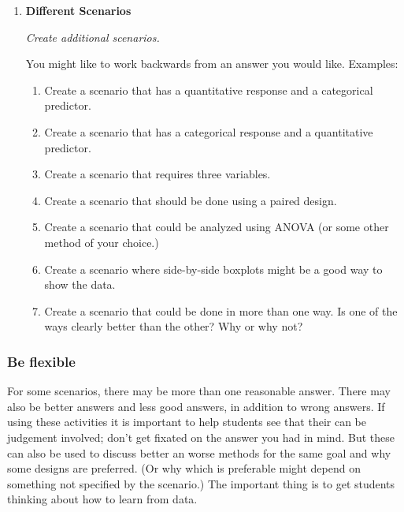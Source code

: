 \documentclass[]{article}
\providecommand{\tightlist}{%
  \setlength{\itemsep}{0pt}\setlength{\parskip}{0pt}}
\begin{document}
\begin{enumerate}
\def\labelenumi{\arabic{enumi}.}
\setcounter{enumi}{2}
\item
  \textbf{Different Scenarios}

  \emph{Create additional scenarios.}

  You might like to work backwards from an answer you would like.
  Examples:

  \begin{enumerate}
  \def\labelenumii{\alph{enumii}.}
  \tightlist
  \item
    Create a scenario that has a quantitative response and a categorical
    predictor.
  \item
    Create a scenario that has a categorical response and a quantitative
    predictor.
  \item
    Create a scenario that requires three variables.
  \item
    Create a scenario that should be done using a paired design.
  \item
    Create a scenario that could be analyzed using ANOVA (or some other
    method of your choice.)
  \item
    Create a scenario where side-by-side boxplots might be a good way to
    show the data.
  \item
    Create a scenario that could be done in more than one way. Is one of
    the ways clearly better than the other? Why or why not?
  \end{enumerate}
\end{enumerate}

\hypertarget{be-flexible}{%
\subsubsection{Be flexible}\label{be-flexible}}

For some scenarios, there may be more than one reasonable answer. There
may also be better answers and less good answers, in addition to wrong
answers. If using these activities it is important to help students see
that their can be judgement involved; don't get fixated on the answer
you had in mind. But these can also be used to discuss better an worse
methods for the same goal and why some designs are preferred. (Or why
which is preferable might depend on something not specified by the
scenario.) The important thing is to get students thinking about how to
learn from data.
\end{document}
